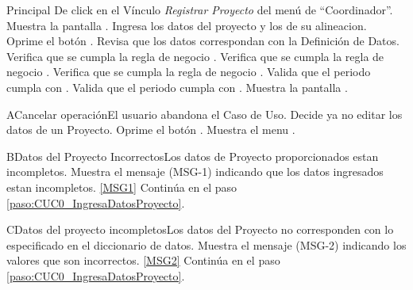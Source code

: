 	\begin{UCtrayectoria}{Principal}
			\UCpaso[\UCactor] De click en el Vínculo \textit{Registrar Proyecto} del menú de ``Coordinador''.
			\UCpaso Muestra la pantalla .
			\UCpaso [\UCactor] Ingresa los datos del proyecto y los de su alineacion.\label{paso:CUC0_IngresaDatosProyecto} 
			\UCpaso [\UCactor] Oprime el botón .\label{paso:CUC0_OprimeAceptar}
			\UCpaso Revisa que los datos correspondan con la Definición de Datos.  
			\UCpaso Verifica que se cumpla la regla de negocio .
			\UCpaso Verifica que se cumpla la regla de negocio .
			\UCpaso Verifica que se cumpla la regla de negocio .
			\UCpaso Valida que el periodo cumpla con   .
			\UCpaso Valida que el periodo cumpla con   .
			\UCpaso Muestra la pantalla .
% 			
	\end{UCtrayectoria}

	\begin{UCtrayectoriaA}{A}{Cancelar operación}{El usuario abandona el Caso de Uso.}
			\UCpaso[\UCactor] Decide ya no editar los datos de un Proyecto.
			\UCpaso[\UCactor] Oprime el botón .
			\UCpaso Muestra el menu .
	\end{UCtrayectoriaA}


	\begin{UCtrayectoriaA}{B}{Datos del Proyecto Incorrectos}{Los datos de Proyecto proporcionados estan incompletos.}
			\UCpaso Muestra el mensaje (MSG-1) indicando que los datos ingresados estan incompletos. \ref{MSG1}
			\UCpaso Continúa en el paso \ref{paso:CUC0_IngresaDatosProyecto}.
	\end{UCtrayectoriaA}

	\begin{UCtrayectoriaA}{C}{Datos del proyecto incompletos}{Los datos del Proyecto no corresponden con lo especificado en el diccionario de datos.}
			\UCpaso Muestra el mensaje (MSG-2) indicando los valores que son incorrectos. \ref{MSG2}
			\UCpaso Continúa en el paso \ref{paso:CUC0_IngresaDatosProyecto}.
	\end{UCtrayectoriaA}

